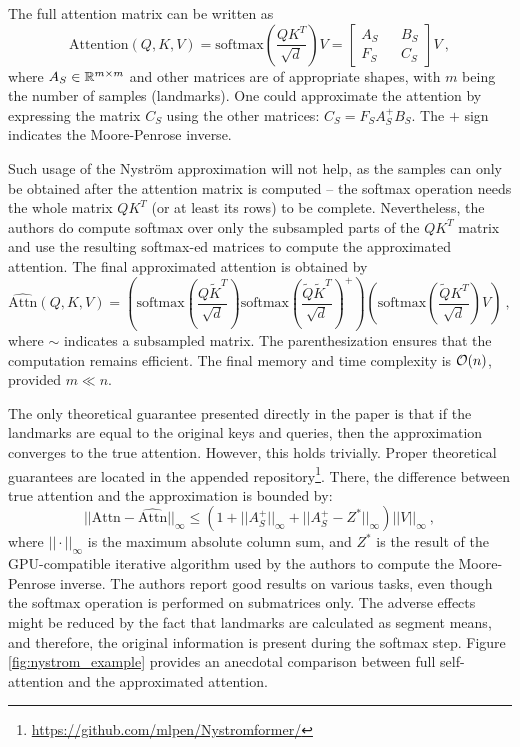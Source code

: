 The full attention matrix can be written as
\begin{equation}
        \text{Attention}(Q,K,V)=\text{softmax}\left(\frac{QK^T}{\sqrt{d}}\right)V=
        \begin{bmatrix}
                A_S && B_S \\
                F_S && C_S
        \end{bmatrix}V\ ,
\end{equation}
where $A_S\in\mathbb{R}^{m\times m}$ and other matrices are of appropriate shapes, with $m$ being the number of samples (landmarks). 
One could approximate the attention by expressing the matrix $C_S$ using the other matrices: $C_S=F_SA_S^+B_S$. The $+$ sign indicates the Moore-Penrose inverse.

Such usage of the Nystr\"om approximation will not help, as the samples can only be obtained after the attention matrix is computed -- the softmax operation needs the whole matrix $QK^T$ (or at least its rows) to be complete. 
Nevertheless, the authors do compute softmax over only the subsampled parts of the $QK^T$ matrix and use the resulting softmax-ed matrices to compute the approximated attention.
The final approximated attention is obtained by 
\begin{equation}
        \widehat{\text{Attn}}(Q,K,V)=
        \left(
        \text{softmax}\left(\frac{Q\tilde{K}^T}{\sqrt{d}}\right)
        \text{softmax}\left(\frac{\tilde{Q}\tilde{K}^T}{\sqrt{d}}\right)^+
        \right)
        \left(
        \text{softmax}\left(\frac{\tilde{Q}K^T}{\sqrt{d}}\right)
        V
        \right)
        \ ,
\end{equation}
where $\sim$ indicates a subsampled matrix. The parenthesization ensures that the computation remains efficient. The final memory and time complexity is $\mathcal{O}(n)$, provided $m\ll n$.

The only theoretical guarantee presented directly in the paper is that if the landmarks are equal to the original keys and queries, then the approximation converges to the true attention. 
However, this holds trivially.
Proper theoretical guarantees are located in the appended repository\footnote{\url{https://github.com/mlpen/Nystromformer/}}.
There, the difference between true attention and the approximation is bounded by:
\begin{equation}
        ||\text{Attn}-\widehat{\text{Attn}}||_\infty\leq(1+||A^+_S||_\infty+||A^+_S-Z^*||_\infty)||V||_\infty\ ,
\end{equation}
where $||\cdot||_\infty$ is the maximum absolute column sum, and $Z^*$ is the result of the GPU-compatible iterative algorithm \citep{iterative-moore} used by the authors to compute the Moore-Penrose inverse.
The authors report good results on various tasks, even though the softmax operation is performed on submatrices only. 
The adverse effects might be reduced by the fact that landmarks are calculated as segment means, and therefore, the original information is present during the softmax step.
Figure \ref{fig:nystrom_example} provides an anecdotal comparison between full self-attention and the approximated attention.

